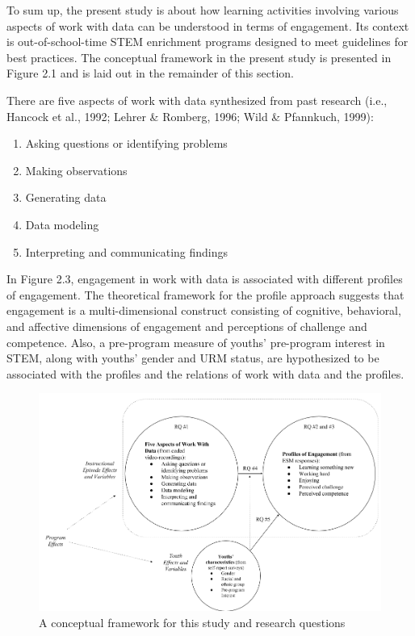 \documentclass[]{msu-thesis}
\providecommand{\tightlist}{%
  \setlength{\itemsep}{0pt}\setlength{\parskip}{0pt}}
\theoremstyle{definition}
\theoremstyle{definition}
\theoremstyle{definition}
\theoremstyle{remark}
\begin{document}
To sum up, the present study is about how learning activities involving
various aspects of work with data can be understood in terms of
engagement. Its context is out-of-school-time STEM enrichment programs
designed to meet guidelines for best practices. The conceptual framework
in the present study is presented in Figure 2.1 and is laid out in the
remainder of this section.

There are five aspects of work with data synthesized from past research
(i.e., Hancock et al., 1992; Lehrer \& Romberg, 1996; Wild \& Pfannkuch,
1999):

\begin{enumerate}
\def\labelenumi{\arabic{enumi}.}
\tightlist
\item
  Asking questions or identifying problems
\item
  Making observations
\item
  Generating data
\item
  Data modeling
\item
  Interpreting and communicating findings
\end{enumerate}

In Figure 2.3, engagement in work with data is associated with different
profiles of engagement. The theoretical framework for the profile
approach suggests that engagement is a multi-dimensional construct
consisting of cognitive, behavioral, and affective dimensions of
engagement and perceptions of challenge and competence. Also, a
pre-program measure of youths' pre-program interest in STEM, along with
youths' gender and URM status, are hypothesized to be associated with
the profiles and the relations of work with data and the profiles.

\begin{figure}

{\centering \includegraphics[width=0.8\linewidth]{images/figure2}

}

\caption{A conceptual framework for this study and research questions}\label{fig:unnamed-chunk-1}
\end{figure}
\end{document}
